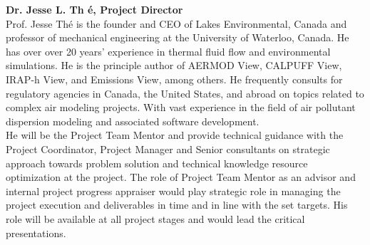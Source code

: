 \textbf{Dr. Jesse L. Th \'e, Project Director} \\
Prof. Jesse Th\'e is the founder and CEO of Lakes Environmental, Canada and professor of mechanical engineering at the University of Waterloo, Canada. He has over over 20 years' experience in thermal fluid flow and environmental simulations. He is the principle author of AERMOD View, CALPUFF View, IRAP-h View, and Emissions View, among others. He frequently consults for regulatory agencies in Canada, the United States, and abroad on topics related to complex air modeling projects.  With vast experience in the field of air pollutant dispersion modeling and associated software development.   \\
He will be the Project Team Mentor and provide technical guidance with the Project Coordinator, Project Manager and Senior consultants on strategic approach towards problem solution and technical knowledge resource optimization at the project. The role of Project Team Mentor as an advisor and internal project progress appraiser would play strategic role in managing the project execution and deliverables in time and in line with the set targets. His role will be available at all project stages and would lead the critical presentations.\\

